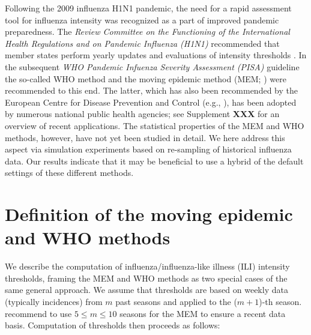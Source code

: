 \documentclass{article}
\begin{document}
Following the 2009 influenza H1N1 pandemic, the need for a rapid assessment tool for influenza intensity was recognized as a part of improved pandemic preparedness. The \textit{Review Committee on the Functioning of the
International Health Regulations and on Pandemic Influenza (H1N1)} recommended that member states perform yearly updates and evaluations of intensity thresholds \citep[p.118]{WHO2011}. In the subsequent \textit{WHO Pandemic Infuenza Severity Assessment (PISA)} guideline \citep{WHO2017} the so-called WHO method \citep{WHO2014} and the moving epidemic method (MEM; \citealt{Vega2013, Vega2015}) were recommended to this end. The latter, which has also been recommended by the European Centre for Disease Prevention and Control (e.g., \citealt{ECDC2017}), has been adopted by numerous national public health agencies; see Supplement \textbf{XXX} for an overview of recent applications. The statistical properties of the MEM and WHO methods, however, have not yet been studied in detail. We here address this aspect via simulation experiments based on re-sampling of historical influenza data. Our results indicate that it may be beneficial to use a hybrid of the default settings of these different methods.%


\section{Definition of the moving epidemic and WHO methods}
\label{sec:definitions}

We describe the computation of influenza/influenza-like illness (ILI) intensity thresholds, framing the MEM and WHO methods as two special cases of the same general approach. We assume that thresholds are based on weekly data (typically incidences) from $m$ past seasons and applied to the ($m + 1$)-th season. \cite{Vega2015} recommend to use $5 \leq m \leq 10$ seasons for the MEM to ensure a recent data basis. Computation of thresholds then proceeds as follows:
\end{document}
